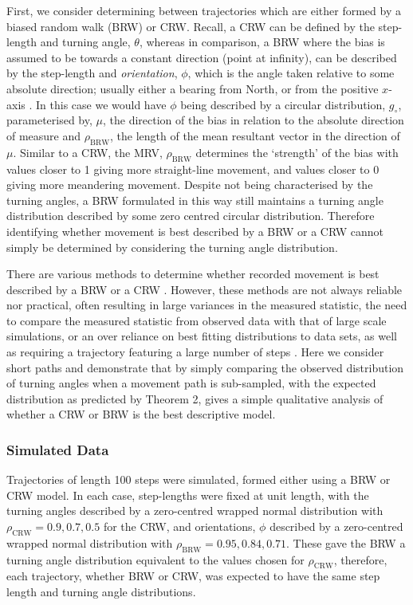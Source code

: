 \documentclass[english]{article}
\begin{document}
First, we consider determining between trajectories which are either formed by a biased random walk (BRW) or CRW.  Recall, a CRW can be defined by the step-length and turning angle, $\theta$, whereas in comparison, a BRW where the bias is assumed to be towards a constant direction (point at infinity), can be described by the step-length and \textit{orientation}, $\phi$, which is the angle taken relative to some absolute direction; usually either a bearing from North, or from the positive $x$-axis \citep{codling2008random,bailey2018navigational}.  In this case we would have $\phi$ being described by a circular distribution, $g_{\circ}$, parameterised by, $\mu$, the direction of the bias in relation to the absolute direction of measure and $\rho_{\text{BRW}}$, the length of the mean resultant vector in the direction of $\mu$.  Similar to a CRW, the MRV, $\rho_\text{BRW}$ determines the `strength' of the bias with values closer to 1 giving more straight-line movement, and values closer to 0 giving more meandering movement. Despite not being characterised by the turning angles, a BRW formulated in this way still maintains a turning angle distribution described by some zero centred circular distribution.  Therefore identifying whether movement is best described by a BRW or a CRW cannot simply be determined by considering the turning angle distribution.

There are various methods to determine whether recorded movement is best described by a BRW or a CRW \citep{benhamou2006detecting,marsh1988form}.  However, these methods are not always reliable nor practical, often resulting in large variances in the measured statistic, the need to compare the measured statistic from observed data with that of large scale simulations, or an over reliance on best fitting distributions to data sets, as well as requiring a trajectory featuring a large number of steps \citet{benhamou2006detecting}.  Here we consider short paths and demonstrate that by simply comparing the observed distribution of turning angles when a movement path is sub-sampled, with the expected distribution as predicted by Theorem 2, gives a simple qualitative analysis of whether a CRW or BRW is the best descriptive model.

\subsubsection{Simulated Data}
Trajectories of length 100 steps were simulated, formed either using a BRW or CRW model.  In each case, step-lengths were fixed at unit length, with the turning angles described by a zero-centred wrapped normal distribution with $\rho_{\text{CRW}}=0.9, 0.7, 0.5$ for the CRW, and orientations, $\phi$ described by a zero-centred wrapped normal distribution with $\rho_{\text{BRW}}=0.95, 0.84, 0.71$.  These gave the BRW a turning angle distribution equivalent to the values chosen for $\rho_{\text{CRW}}$, therefore, each trajectory, whether BRW or CRW, was expected to have the same step length and turning angle distributions.
\end{document}
